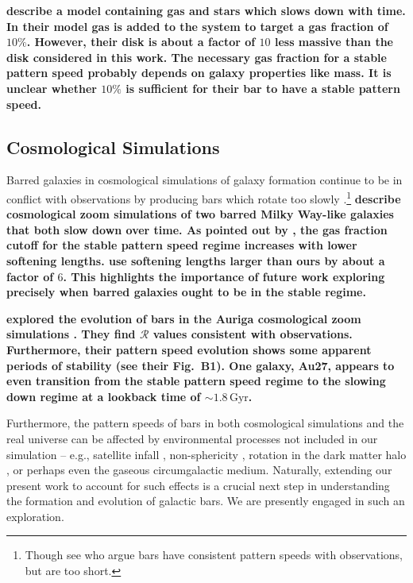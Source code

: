 \documentclass[twocolumn,linenumbers,trackchanges]{aastex631}
\newcommand{\Rot}{\ensuremath{\mathcal{R}}}
\begin{document}
{\bf \citet{2015MNRAS.454.3166A} describe a model containing gas and stars which
slows down with time. In their model gas is added to the system to target a gas
fraction of $10\%$. However, their disk is about a factor of $10$ less massive
than the disk considered in this work. The necessary gas fraction for a stable
pattern speed probably depends on galaxy properties like mass. It is unclear
whether $10\%$ is sufficient for their bar to have a stable pattern speed.}

\subsection{Cosmological Simulations}
Barred galaxies in cosmological simulations of galaxy formation continue to be
in conflict with observations by producing bars which rotate too slowly
\citep{2017MNRAS.469.1054A, 2019MNRAS.483.2721P, 2021AA...650L..16F,
2022ApJ...940...61F}.\footnote{Though see \citet{2022ApJ...940...61F} who argue
bars have consistent pattern speeds with observations, but are too short.}
{\bf \citet{2015PASJ...67...63O} describe cosmological zoom simulations of two barred
Milky Way-like galaxies that both slow down over time. As pointed out by
\citet{2010ApJ...719.1470V}, the gas fraction cutoff for the stable pattern
speed regime increases with lower softening lengths. \citet{2015PASJ...67...63O}
use softening lengths larger than ours by about a factor of $6$. This highlights
the importance of future work exploring precisely when barred galaxies ought to
be in the stable regime.}

{\bf \citet{2021AA...650L..16F} explored the evolution of bars in the Auriga
cosmological zoom simulations \citep{2017MNRAS.467..179G}. They find \Rot{}
values consistent with observations. Furthermore, their pattern speed evolution
shows some apparent periods of stability (see their Fig.~B1). One galaxy, Au27,
appears to even transition from the stable pattern speed regime to the slowing
down regime at a lookback time of $\sim1.8\,\textrm{Gyr}$.}

Furthermore, the pattern speeds of bars in both cosmological simulations and the
real universe can be affected by environmental processes not included in our
simulation -- e.g., satellite infall \citep{2011Natur.477..301P}, non-sphericity
\citep{2013MNRAS.429.1949A}, rotation in the dark matter halo
\citep{2013MNRAS.434.1287S, 2014ApJ...783L..18L, 2018MNRAS.476.1331C,
2019MNRAS.488.5788C}, or perhaps even the gaseous circumgalactic medium.
Naturally, extending our present work to account for such effects is a crucial
next step in understanding the formation and evolution of galactic bars. We are
presently engaged in such an exploration.
\end{document}
